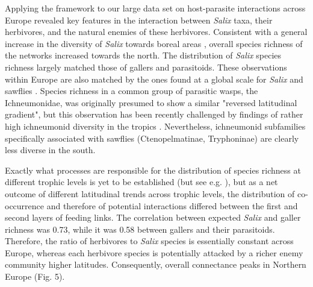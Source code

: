\documentclass[12pt]{article}
\begin{document}
Applying the framework to our large data set on host-parasite interactions
across Europe revealed key features in the interaction between \textit{Salix}
taxa, their herbivores, and the natural enemies of these herbivores.
Consistent with a general increase in the diversity of \textit{Salix} towards
boreal areas \citep{Cronk2015}, overall species richness of the networks
increased towards the north. The distribution of \textit{Salix} species
richness largely matched those of gallers and parasitoids. These observations
within Europe are also matched by the ones found at a global scale for
\textit{Salix} \citep{Argus1997, Cronk2015, Wu2015} and sawflies
\citep{Kouki1994, Kouki1999}. Species richness in a common group of parasitic
wasps, the Ichneumonidae, was originally presumed to show a similar "reversed
latitudinal gradient", but this observation has been recently challenged by
findings of rather high ichneumonid diversity in the tropics
\citep{Veijalainen2013}. Nevertheless, ichneumonid subfamilies specifically
associated with sawflies (Ctenopelmatinae, Tryphoninae) are clearly less
diverse in the south.

Exactly what processes are responsible for the distribution of species
richness at different trophic levels is yet to be established (but see e.g.
\citealt{Roininen2005, Nyman2010, Leppanen2014}), but as a net outcome of
different latitudinal trends across trophic levels, the distribution of co-
occurrence and therefore of potential interactions differed between the first
and second layers of feeding links. The correlation between expected
\textit{Salix} and galler richness was 0.73, while it was 0.58 between gallers
and their parasitoids. Therefore, the ratio of herbivores to \textit{Salix}
species is essentially constant across Europe, whereas each herbivore species
is potentially attacked by a richer enemy community higher latitudes.
Consequently, overall connectance peaks in Northern Europe (Fig. 5).
\end{document}
